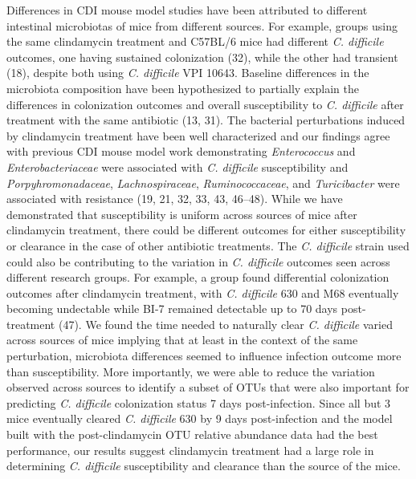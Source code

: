 \documentclass[11pt,]{article}
\begin{document}
Differences in CDI mouse model studies have been attributed to different
intestinal microbiotas of mice from different sources. For example,
groups using the same clindamycin treatment and C57BL/6 mice had
different \emph{C. difficile} outcomes, one having sustained
colonization (32), while the other had transient (18), despite both
using \emph{C. difficile} VPI 10643. Baseline differences in the
microbiota composition have been hypothesized to partially explain the
differences in colonization outcomes and overall susceptibility to
\emph{C. difficile} after treatment with the same antibiotic (13, 31).
The bacterial perturbations induced by clindamycin treatment have been
well characterized and our findings agree with previous CDI mouse model
work demonstrating \emph{Enterococcus} and \emph{Enterobacteriaceae}
were associated with \emph{C. difficile} susceptibility and
\emph{Porpyhromonadaceae}, \emph{Lachnospiraceae},
\emph{Ruminococcaceae}, and \emph{Turicibacter} were associated with
resistance (19, 21, 32, 33, 43, 46--48). While we have demonstrated that
susceptibility is uniform across sources of mice after clindamycin
treatment, there could be different outcomes for either susceptibility
or clearance in the case of other antibiotic treatments. The \emph{C.
difficile} strain used could also be contributing to the variation in
\emph{C. difficile} outcomes seen across different research groups. For
example, a group found differential colonization outcomes after
clindamycin treatment, with \emph{C. difficile} 630 and M68 eventually
becoming undectable while BI-7 remained detectable up to 70 days
post-treatment (47). We found the time needed to naturally clear
\emph{C. difficile} varied across sources of mice implying that at least
in the context of the same perturbation, microbiota differences seemed
to influence infection outcome more than susceptibility. More
importantly, we were able to reduce the variation observed across
sources to identify a subset of OTUs that were also important for
predicting \emph{C. difficile} colonization status 7 days
post-infection. Since all but 3 mice eventually cleared \emph{C.
difficile} 630 by 9 days post-infection and the model built with the
post-clindamycin OTU relative abundance data had the best performance,
our results suggest clindamycin treatment had a large role in
determining \emph{C. difficile} susceptibility and clearance than the
source of the mice.
\end{document}

